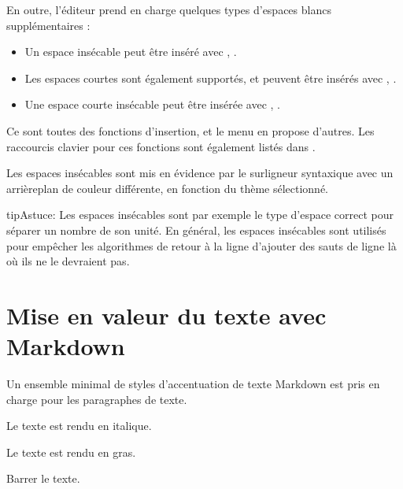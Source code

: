 \documentclass[a4paper,11pt,french]{sphinxmanual}
\begin{document}
\sphinxAtStartPar
En outre, l’éditeur prend en charge quelques types d’espaces blancs supplémentaires :
\begin{itemize}
\item {} 
\sphinxAtStartPar
Un espace insécable peut être inséré avec , .

\item {} 
\sphinxAtStartPar
Les espaces courtes sont également supportés, et peuvent être insérés avec , .

\item {} 
\sphinxAtStartPar
Une espace courte insécable peut être insérée avec , .

\end{itemize}

\sphinxAtStartPar
Ce sont toutes des fonctions d’insertion, et le menu  en propose d’autres. Les raccourcis clavier pour ces fonctions sont également listés dans {\hyperref[\detokenize{usage_shortcuts:a-kb-ins}]{}}.

\sphinxAtStartPar
Les espaces insécables sont mis en évidence par le surligneur syntaxique avec un arrière\sphinxhyphen{}plan de couleur différente, en fonction du thème sélectionné.

\begin{sphinxadmonition}{tip}{Astuce:}
\sphinxAtStartPar
Les espaces insécables sont par exemple le type d’espace correct pour séparer un nombre de son unité. En général, les espaces insécables sont utilisés pour empêcher les algorithmes de retour à la ligne d’ajouter des sauts de ligne là où ils ne le devraient pas.
\end{sphinxadmonition}


\section{Mise en valeur du texte avec Markdown}
\label{\detokenize{usage_format:text-emphasis-with-markdown}}\label{\detokenize{usage_format:a-fmt-emph}}
\sphinxAtStartPar
Un ensemble minimal de styles d’accentuation de texte Markdown est pris en charge pour les paragraphes de texte.
\begin{description}
\sphinxAtStartPar
Le texte est rendu en italique.

\sphinxAtStartPar
Le texte est rendu en gras.

\sphinxAtStartPar
Barrer le texte.

\end{description}
\end{document}
